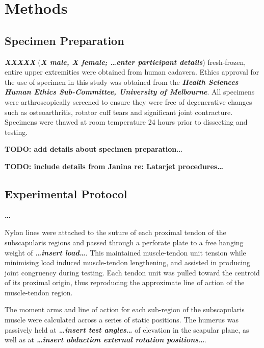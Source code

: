 \documentclass[]{elsarticle} %
\begin{document}
\hypertarget{methods}{%
\section{Methods}\label{methods}}

\hypertarget{specimen-preparation}{%
\subsection{Specimen Preparation}\label{specimen-preparation}}

\textbf{\emph{XXXXX}} (\textbf{\emph{X male, X female; \ldots enter
participant details}}) fresh-frozen, entire upper extremities were
obtained from human cadavera. Ethics approval for the use of specimen in
this study was obtained from the \textbf{\emph{Health Sciences Human
Ethics Sub-Committee, University of Melbourne}}. All specimens were
arthroscopically screened to ensure they were free of degenerative
changes such as osteoarthritis, rotator cuff tears and significant joint
contracture. Specimens were thawed at room temperature 24 hours prior to
dissecting and testing.

\textbf{TODO: add details about specimen preparation\ldots{}}

\textbf{TODO: include details from Janina re: Latarjet
procedures\ldots{}}

\hypertarget{experimental-protocol}{%
\subsection{Experimental Protocol}\label{experimental-protocol}}

\textbf{\ldots{}}

Nylon lines were attached to the suture of each proximal tendon of the
subscapularis regions and passed through a perforate plate to a free
hanging weight of \textbf{\emph{\ldots insert load\ldots{}}}. This
maintained muscle-tendon unit tension while minimising load induced
muscle-tendon lengthening, and assisted in producing joint congruency
during testing. Each tendon unit was pulled toward the centroid of its
proximal origin, thus reproducing the approximate line of action of the
muscle-tendon region.

The moment arms and line of action for each sub-region of the
subscapularis muscle were calculated across a series of static
positions. The humerus was passively held at \textbf{\emph{\ldots insert
test angles\ldots{}}} of elevation in the scapular plane, as well as at
\textbf{\emph{\ldots insert abduction external rotation
positions\ldots{}}}.
\end{document}

